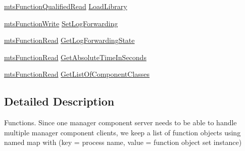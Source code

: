\begin{DoxyCompactItemize}
\hyperlink{classmts_function_qualified_read}{mts\-Function\-Qualified\-Read} \hyperlink{structmts_manager_component_server_1_1_interface_g_c_m_function_type_aa315e1ac5f0bfae4aca4435eea5ca8ff}{Load\-Library}
\item 
\hyperlink{classmts_function_write}{mts\-Function\-Write} \hyperlink{structmts_manager_component_server_1_1_interface_g_c_m_function_type_a77180d227fd77e4ad2de4862b82713d4}{Set\-Log\-Forwarding}
\item 
\hyperlink{classmts_function_read}{mts\-Function\-Read} \hyperlink{structmts_manager_component_server_1_1_interface_g_c_m_function_type_a7323a2480138e7cb183178bd7da16862}{Get\-Log\-Forwarding\-State}
\item 
\hyperlink{classmts_function_read}{mts\-Function\-Read} \hyperlink{structmts_manager_component_server_1_1_interface_g_c_m_function_type_a59b6a8abd6bbee0edcc9470a447d66ef}{Get\-Absolute\-Time\-In\-Seconds}
\item 
\hyperlink{classmts_function_read}{mts\-Function\-Read} \hyperlink{structmts_manager_component_server_1_1_interface_g_c_m_function_type_a1002b4425d7edf9645e7e2f4b7f43098}{Get\-List\-Of\-Component\-Classes}
\end{DoxyCompactItemize}


\subsection{Detailed Description}
Functions. Since one manager component server needs to be able to handle multiple manager component clients, we keep a list of function objects using named map with (key = process name, value = function object set instance) 

